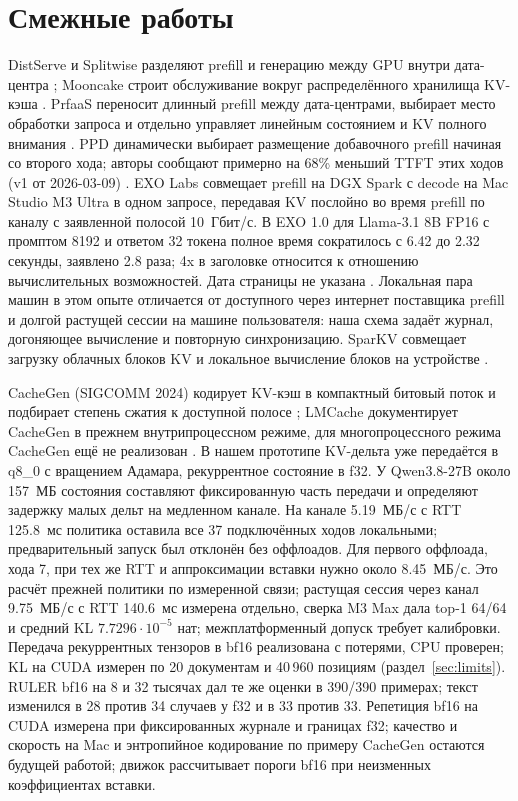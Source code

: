 \section{Смежные работы}
\label{sec:related}

DistServe и Splitwise разделяют prefill и генерацию между GPU внутри дата-центра
\cite{zhong2024distserve,patel2023splitwise}; Mooncake строит обслуживание вокруг распределённого хранилища
KV-кэша \cite{qin2024mooncake}. PrfaaS переносит длинный prefill между дата-центрами, выбирает место обработки
запроса и отдельно управляет линейным состоянием и KV полного внимания \cite{qin2026prfaas}.
PPD динамически выбирает размещение добавочного prefill начиная со второго хода; авторы сообщают
примерно на 68\% меньший TTFT этих ходов (v1 от 2026-03-09) \cite{li2026ppd}.
EXO Labs совмещает prefill на DGX Spark с decode на Mac Studio M3 Ultra в одном запросе,
передавая KV послойно во время prefill по каналу с заявленной полосой 10~Гбит/с. В EXO 1.0
для Llama-3.1 8B FP16 с промптом 8192 и ответом 32 токена полное время сократилось с 6.42 до 2.32 секунды,
заявлено 2.8 раза; 4x в заголовке относится к отношению вычислительных возможностей. Дата страницы не указана \cite{exolabsSpark}. Локальная пара машин в этом опыте
отличается от доступного через интернет поставщика prefill и долгой растущей сессии на машине пользователя:
наша схема задаёт журнал, догоняющее вычисление и повторную синхронизацию.
SparKV совмещает загрузку облачных блоков KV и локальное вычисление блоков на устройстве \cite{liu2026sparkv}.

CacheGen (SIGCOMM 2024) кодирует KV-кэш в компактный битовый поток и подбирает степень сжатия
к доступной полосе \cite{liu2024cachegen}; LMCache документирует CacheGen в прежнем внутрипроцессном режиме,
для многопроцессного режима CacheGen ещё не реализован \cite{lmcacheCachegen}.
В нашем прототипе KV-дельта уже передаётся в q8\_0 с вращением Адамара, рекуррентное состояние в f32.
У Qwen3.8-27B около 157~МБ состояния составляют фиксированную часть передачи и определяют задержку
малых дельт на медленном канале. На канале 5.19~МБ/с с RTT 125.8~мс политика оставила
все 37 подключённых ходов локальными; предварительный запуск был отклонён без оффлоадов.
Для первого оффлоада, хода 7, при тех же RTT и аппроксимации вставки нужно около 8.45~МБ/с.
Это расчёт прежней политики по измеренной связи; растущая сессия через канал 9.75~МБ/с с RTT 140.6~мс измерена отдельно, сверка M3 Max дала top-1 64/64 и средний KL $7.7296\cdot10^{-5}$ нат; межплатформенный допуск требует калибровки.
Передача рекуррентных тензоров в bf16 реализована с потерями, CPU проверен; KL на CUDA измерен по 20 документам и 40\,960 позициям (раздел~\ref{sec:limits}).
RULER bf16 на 8 и 32 тысячах дал те же оценки в 390/390 примерах; текст изменился в 28 против 34 случаев у f32 и в 33 против 33. Репетиция bf16 на CUDA измерена при фиксированных журнале и границах f32; качество и скорость на Mac и энтропийное кодирование по примеру CacheGen остаются будущей работой; движок рассчитывает пороги bf16 при неизменных коэффициентах вставки.

